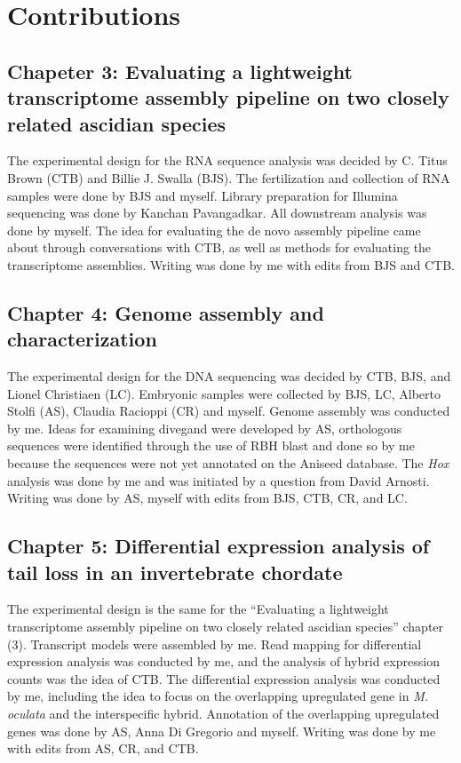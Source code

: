 \chapter{Contributions}
\section{Chapeter 3: Evaluating a lightweight transcriptome assembly pipeline on two closely related ascidian species}
The experimental design for the RNA sequence analysis was decided by C. Titus Brown (CTB) and Billie J. Swalla (BJS). The fertilization and collection of RNA samples were done by BJS and myself. Library preparation for Illumina sequencing was done by Kanchan Pavangadkar. All downstream analysis was done by myself. The idea for evaluating the de novo assembly pipeline came about through conversations with CTB, as well as methods for evaluating the transcriptome assemblies. Writing was done by me with edits from BJS and CTB.

\section{Chapter 4: Genome assembly and characterization}
The experimental design for the DNA sequencing was decided by CTB, BJS, and Lionel Christiaen (LC). Embryonic samples were collected by BJS, LC, Alberto Stolfi (AS), Claudia Racioppi (CR) and myself. Genome assembly was conducted by me. Ideas for examining divegand were developed by AS, orthologous sequences were identified through the use of RBH blast and done so by me because the sequences were not yet annotated on the Aniseed database. The \textit{Hox} analysis was done by me and was initiated by a question from David Arnosti. Writing was done by AS, myself with edits from BJS, CTB, CR, and LC.

\section{Chapter 5: Differential expression analysis of tail loss in an invertebrate chordate}
The experimental design is the same for the ``Evaluating a lightweight transcriptome assembly pipeline on two closely related ascidian species'' chapter (3). Transcript models were assembled by me. Read mapping for differential expression analysis was conducted by me, and the analysis of hybrid expression counts was the idea of CTB. The differential expression analysis was conducted by me, including the idea to focus on the overlapping upregulated gene in \textit{M. oculata} and the interspecific hybrid. Annotation of the overlapping upregulated genes was done by AS, Anna Di Gregorio and myself. Writing was done by me with edits from AS, CR, and CTB.
